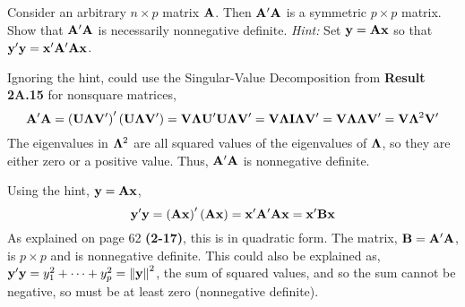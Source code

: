 Consider an arbitrary $n \times p$ matrix $\bold{A}$. Then $\bold{A}^\prime \bold{A}$ is a symmetric $p \times p$ matrix. Show
        that $\bold{A}^\prime \bold{A}$ is necessarily nonnegative definite.
        \newline
        \textit{Hint:} Set $\bold{y} = \bold{A}\bold{x}$ so that $\bold{y}^\prime\bold{y} = \bold{x}^\prime\bold{A}^\prime\bold{A}\bold{x}$.
        \newline
        \par
        Ignoring the hint, could use the Singular-Value Decomposition from \textbf{Result 2A.15} for nonsquare matrices,
        \[
            \bold{A}^\prime\bold{A} 
            = 
            {\left(\bold{U}\bold{\Lambda}\bold{V}^\prime\right)}^\prime\left(\bold{U}\bold{\Lambda}\bold{V}^\prime\right)
            =
            \bold{V}\bold{\Lambda}\bold{U}^\prime\bold{U}\bold{\Lambda}\bold{V}^\prime
            =
            \bold{V}\bold{\Lambda}\bold{I}\bold{\Lambda}\bold{V}^\prime
            =
            \bold{V}\bold{\Lambda}\bold{\Lambda}\bold{V}^\prime
            =
            \bold{V}\bold{\Lambda}^2\bold{V}^\prime
        \]
        The eigenvalues in $\bold{\Lambda}^2$ are all squared values of the eigenvalues of $\bold{\Lambda}$, so they are either zero or a positive value. Thus, $\bold{A}^\prime\bold{A}$ is nonnegative definite.
        \par
        Using the hint, $\bold{y} = \bold{A}\bold{x}$, 
        \[
            \bold{y}^\prime\bold{y} 
            = 
            {\left(\bold{A}\bold{x}\right)}^\prime\left(\bold{A}\bold{x}\right)
            =
            \bold{x}^\prime\bold{A}^\prime\bold{A}\bold{x}
            =
            \bold{x}^\prime\bold{B}\bold{x}
        \]
        As explained on page 62 \textbf{(2-17)}, this is in quadratic form. The matrix, $\bold{B} = \bold{A}^\prime\bold{A}$, is $p \times p$ and is nonnegative definite. This could also be explained as, $\bold{y}^\prime\bold{y} = y_1^2 + \dots + y_p^2 = \left\|\bold{y}\right\|^2$, the sum of squared values, and so the sum cannot be negative, so must be at least zero (nonnegative definite).